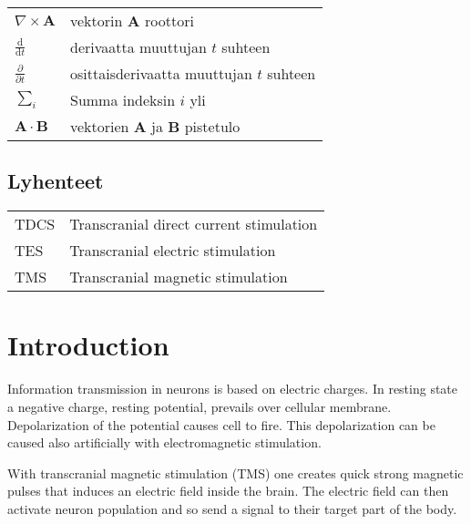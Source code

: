 \documentclass[english,12pt,a4paper,dvips]{article}
\begin{document}
\begin{tabular}{ll}
$\nabla \times \mathbf{A}$              & vektorin $\mathbf{A}$ roottori\\
$\displaystyle\frac{\mbox{d}}{\mbox{d} t}$ & derivaatta muuttujan $t$ suhteen\\
[3mm]
$\displaystyle\frac{\partial}{\partial t}$  & osittaisderivaatta muuttujan $t$ suhteen \\[3mm]
$\sum_i $                       & Summa indeksin $i$ yli\\
$\mathbf{A} \cdot \mathbf{B}$    & vektorien $\mathbf{A}$ ja $\mathbf{B}$ pistetulo
\end{tabular}

\subsection*{Lyhenteet}

\begin{tabular}{ll}

TDCS       & Transcranial direct current stimulation \\
TES		   & Transcranial electric stimulation \\
TMS        & Transcranial magnetic stimulation \\

\end{tabular}

\cleardoublepage
\storeinipagenumber
{}
\setcounter{page}{1}



\section{Introduction}

\thispagestyle{empty}

Information transmission in neurons is based on electric charges. In resting state a negative charge, resting potential, prevails over cellular membrane. Depolarization of the potential causes cell to fire. This depolarization can be caused also artificially with electromagnetic stimulation. 

With transcranial magnetic stimulation (TMS) one creates quick strong magnetic pulses that induces an electric field inside the brain. The electric field can then activate neuron population and so send a signal to their target part of the body. 
\end{document}
